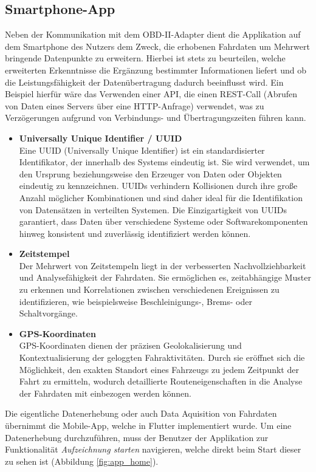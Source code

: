 \documentclass[oneside]{ausarbeitung}
\begin{document}
\subsection*{Smartphone-App}
Neben der Kommunikation mit dem OBD-II-Adapter dient die Applikation auf dem Smartphone des Nutzers dem Zweck, die erhobenen
Fahrdaten um Mehrwert bringende Datenpunkte zu erweitern.
Hierbei ist stets zu beurteilen, welche erweiterten Erkenntnisse die Ergänzung bestimmter Informationen liefert 
und ob die Leistungsfähigkeit der Datenübertragung dadurch beeinflusst wird. Ein Beispiel hierfür wäre das Verwenden
einer API, die einen REST-Call (Abrufen von Daten eines Servers über eine HTTP-Anfrage) verwendet, was zu Verzögerungen
aufgrund von Verbindungs- und Übertragungszeiten führen kann.
\begin{itemize}
  \item \textbf{Universally Unique Identifier / UUID} \\ Eine UUID (Universally Unique Identifier) ist ein 
  standardisierter Identifikator, der innerhalb des Systems eindeutig ist. Sie wird verwendet, um den Ursprung 
  beziehungsweise den Erzeuger von Daten oder Objekten eindeutig zu kennzeichnen. UUIDs verhindern Kollisionen 
  durch ihre große Anzahl möglicher Kombinationen und sind daher ideal für die Identifikation von Datensätzen
  in verteilten Systemen. Die Einzigartigkeit von UUIDs garantiert, dass Daten über verschiedene Systeme oder Softwarekomponenten
  hinweg konsistent und zuverlässig identifiziert werden können.
  \item \textbf{Zeitstempel} \\ Der Mehrwert von Zeitstempeln liegt in der verbesserten Nachvollziehbarkeit und
  Analysefähigkeit der Fahrdaten. Sie ermöglichen es, zeitabhängige Muster zu erkennen und Korrelationen zwischen 
  verschiedenen Ereignissen zu identifizieren, wie beispielsweise Beschleinigungs-, Brems- oder Schaltvorgänge.
  \item \textbf{GPS-Koordinaten} \\ GPS-Koordinaten dienen der präzisen Geolokalisierung und Kontextualisierung 
  der geloggten Fahraktivitäten. Durch sie eröffnet sich die Möglichkeit, den exakten Standort eines Fahrzeugs zu
  jedem Zeitpunkt der Fahrt zu ermitteln, wodurch detaillierte Routeneigenschaften in die Analyse der Fahrdaten mit einbezogen
  werden können.
\end{itemize}

Die eigentliche Datenerhebung oder auch Data Aquisition von Fahrdaten übernimmt die Mobile-App, welche in Flutter
implementiert wurde. Um eine Datenerhebung durchzuführen, muss der Benutzer der Applikation zur Funktionalität 
\textit{Aufzeichnung starten} navigieren, welche direkt beim Start dieser zu sehen ist (Abbildung \ref{fig:app_home}).
\end{document}

